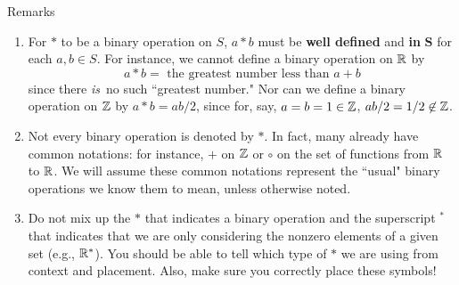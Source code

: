 \begin{df}{Remarks}\

\begin{enumerate}
\item For $*$ to be a binary operation on $S$, $a*b$ must be
    \textbf{well defined} and \textbf{in} $\mathbf{S}$ for each $a,b\in S$.
    For instance, we cannot define a binary operation on
    $\mathbb{R}$ by $$a*b=\mbox{ the greatest number less than
    $a+b$}$$ since there \textit{is}\, no such ``greatest number."
    Nor can we define a binary operation on $\mathbb{Z}$ by $a*b=ab/2$,
    since for, say, $a=b=1 \in \mathbb{Z}$, $ab/2=1/2 \not\in \mathbb{Z}$.
\item Not every binary operation is denoted by $*$.  In fact, many already have common notations: for instance, $+$ on $\mathbb{Z}$ or $\circ$ on the set of functions from $\mathbb{R}$ to $\mathbb{R}$. We will assume these common notations represent the ``usual" binary operations we know them to mean, unless otherwise noted.
\item Do not mix up the $*$ that indicates a binary operation and the
superscript $^*$ that indicates that we are only considering the
nonzero elements of a given set (e.g., $\mathbb{R}^*$). You should be
able to tell which type of $*$ we are using from context and
placement. Also, make sure you correctly place these symbols!
\end{enumerate}
\end{df}

